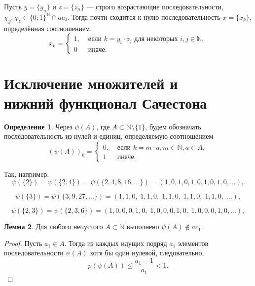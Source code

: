\documentclass[a4paper,openbib]{article}
\renewcommand{\leq}{\leqslant}
\theoremstyle{definition}
\newtheorem{lemma}{Лемма}[section]
\newtheorem{definition}[lemma]{Определение}
\begin{document}
\begin{hypothesis}
	Пусть $y=\{y_n\}$ и $z=\{z_n\}$ --- строго возрастающие последовательности,
	$\chi_y,\chi_z\in\{0;1\}^\mathbb{N} \cap ac_0$.
	Тогда почти сходится к нулю последовательность $x=\{x_k\}$, определённая соотношением
	\begin{equation}
		x_k = \begin{cases}
			1, &\mbox{~если~} k = y_i \cdot z_j \mbox{~для некоторых~} i,j\in\mathbb{N},
			\\
			0  &\mbox{~иначе}
			.
		\end{cases}
	\end{equation}
\end{hypothesis}


\section{Исключение множителей и \\  нижний функционал Сачестона}



\begin{definition}
	Через $\psi(A)$, где $A\subset\mathbb{N}\setminus\{1\}$,
	будем обозначать последовательность из нулей и единиц,
	определяемую соотношением
	\begin{equation}
		(\psi(A))_k = \begin{cases}
			0, & \mbox{~если~} k = m\cdot a, m \in \mathbb{N}, a\in A,
			\\
			1  & \mbox{~иначе.}
		\end{cases}
	\end{equation}
\end{definition}

Так, например,
\begin{equation}
	\psi(\{2\}) = \psi(\{2, 4\}) = \psi(\{2,4,8,16,...\}) = (1,0,1,0,1,0,1,0,1,0,...),
\end{equation}

\begin{equation}
	\psi(\{3\}) = \psi(\{3,9,27,...\}) = (1,1,0,\;1,1,0,\;1,1,0,\;1,1,0,\;1,1,0,\;...),
\end{equation}

\begin{equation}
	\psi(\{2,3\}) = \psi(\{2,3,6\}) = (1,0,0,0,1,0,\;1,0,0,0,1,0,\;1,0,0,0,1,0,...),
\end{equation}


\begin{lemma}
	Для любого непустого $A\subset \mathbb{N} $ выполнено $\psi(A) \notin ac_1$.
\end{lemma}
\begin{proof}
	Пусть $a_1\in A$.
	Тогда из каждых идущих подряд $a_1$ элементов последовательности $\psi(A)$
	хотя бы один нулевой,
	следовательно,
	\begin{equation}
		p(\psi(A)) \leq \frac{a_1-1}{a_1} < 1
		.
	\end{equation}
\end{proof}
\end{document}
